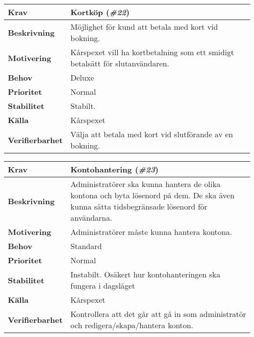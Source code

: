 \documentclass[a4paper, twoside, 11pt, titlepage]{article}
\begin{document}
	\begin{tabular} { p{2.6cm} p{12.5cm} }
		\hline
		\sffamily\textbf{Krav} & Kortköp (\emph{\#22})  \\
		\hline
		\sffamily\textbf{Beskrivning} & Möjlighet för kund att betala med kort vid bokning.  \\
		\hline
		\sffamily\textbf{Motivering} & Kårspexet vill ha kortbetalning som ett smidigt betalsätt för slutanvändaren.  \\
		\hline
		\sffamily\textbf{Behov} & Deluxe  \\
		\hline
		\sffamily\textbf{Prioritet} & Normal  \\
		\hline
		\sffamily\textbf{Stabilitet} & Stabilt.  \\
		\hline
		\sffamily\textbf{Källa} & Kårspexet  \\
		\hline
		\sffamily\textbf{Verifierbarhet} & Välja att betala med kort vid slutförande av en bokning.  \\
		\hline
	\end{tabular}
	\vspace{6mm}

	\begin{tabular} { p{2.6cm} p{12.5cm} }
		\hline
		\sffamily\textbf{Krav} & Kontohantering (\emph{\#23})  \\
		\hline
		\sffamily\textbf{Beskrivning} & Administratörer ska kunna hantera de olika kontona och byta lösenord på dem. De ska även kunna sätta tidsbegränsade lösenord för användarna.   \\
		\hline
		\sffamily\textbf{Motivering} & Administratörer måste kunna hantera kontona.  \\
		\hline
		\sffamily\textbf{Behov} & Standard  \\
		\hline
		\sffamily\textbf{Prioritet} & Normal  \\
		\hline
		\sffamily\textbf{Stabilitet} & Instabilt. Osäkert hur kontohanteringen ska fungera i dagsläget  \\
		\hline
		\sffamily\textbf{Källa} & Kårspexet  \\
		\hline
		\sffamily\textbf{Verifierbarhet} & Kontrollera att det går att gå in som administratör och redigera/skapa/hantera konton.  \\
		\hline
	\end{tabular}
	\vspace{6mm}
\end{document}
